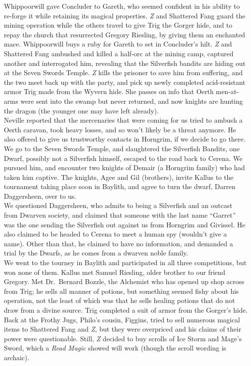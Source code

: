 \documentclass[letterpaper]{article}
\begin{document}
\noindent Whippoorwill gave Concluder to Gareth, who seemed confident in his ability to re-forge it while retaining its magical properties. \emph{Z} and Shattered Fang guard the mining operation while the others travel to give Trig the Gorger hide, and to repay the church that resurrected Gregory Riesling, by giving them an enchanted mace. Whippoorwill buys a ruby for Gareth to set in Concluder's hilt. \emph{Z} and Shattered Fang ambushed and killed a half-orc at the mining camp, captured another and interrogated him, revealing that the Silverfish bandits are hiding out at the Seven Swords Temple. \emph{Z} kills the prisoner to save him from suffering, and the two meet back up with the party, and pick up newly completed acid-resistant armor Trig made from the Wyvern hide.  She passes on info that Oerth men-at-arms were sent into the swamp but never returned, and now knights are hunting the dragon (the younger one may have left already).\\

\noindent Neville reported that the mercenaries that were coming for us tried to ambush a Oerth caravan, took heavy losses, and so won't likely be a threat anymore.  He also offered to give us trustworthy contacts in Horngrim, if we decide to go there.\\

\noindent We go to the Seven Swords Temple, and slaughtered the Silverfish Bandits, one Dwarf, possibly not a Silverfish himself, escaped to the road back to Cerena. We pursued him, and encounter two knights of Demair (a Horngrim family) who had taken him captive. The knights, Agee and Gil (brothers), invite Kallus to the tournament taking place soon in Baylith, and agree to turn the dwarf, Darren Daggersheen, over to us.\\

\noindent We questioned Daggersheen, who admits to being a Silverfish and an outcast from Dwarven society, and claimed that someone with the last name ``Garret'' was the one sending the Silverfish out against us from Horngrim and Givissel. He also claimed to be headed to Cerena to meet a human spy (wouldn't give a name).  Other than that, he claimed to have no information, and demanded a trial by the Dwarfs, as he comes from a dwarven noble family.\\

\noindent We went to the tourney in Baylith and participated in all three competitions, but won none of them. Kallus met Samuel Riesling, older brother to our friend Gregory.  Met Dr.\ Bernard Bozzle, the Alchemist who has opened up shop across from Trig; he sells all manner of potions, but something seemed fishy about his operation, not the least of which was that he sells healing potions that do not draw from a divine source.  Trig completed a suit of armor from the Gorger's hide. Back at the Frothy Jugs, Philo's cousin, Figgins, tried to sell numerous magical items to Shattered Fang and \emph{Z}, but they were overpriced and his claims of their power were questionable. Still, \emph{Z} decided to buy scrolls of Ice Storm and Mage's Sword, which a \emph{Read Magic} showed will work (though the scroll wording is archaic).\\
\end{document}
